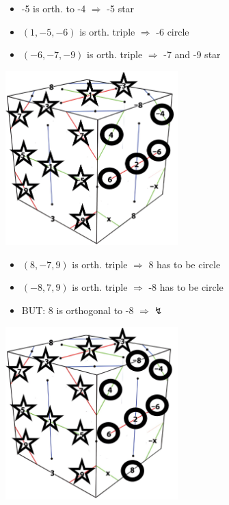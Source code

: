 \documentclass{beamer}
\begin{document}
\begin{frame}
\begin{itemize}
\item -5 is orth. to -4 $\Rightarrow$ -5 star
\item $(1,-5,-6)$ is orth. triple $\Rightarrow$ -6 circle
\item $(-6,-7,-9)$ is orth. triple $\Rightarrow$ -7 and -9 star
\end{itemize}
\begin{center}
\includegraphics[width=0.5\textwidth]{KSProof06.jpg}
\end{center}
\end{frame}

\begin{frame}
\begin{itemize}
\item $(8,-7,9)$ is orth. triple $\Rightarrow$ 8 has to be circle
\item $(-8,7,9)$ is orth. triple $\Rightarrow$ -8 has to be circle
\item BUT: 8 is orthogonal to -8  $\Rightarrow\lightning$
\end{itemize}
\begin{center}
\includegraphics[width=0.5\textwidth]{KSProof07.jpg}
\end{center}
\end{frame}
\end{document}

